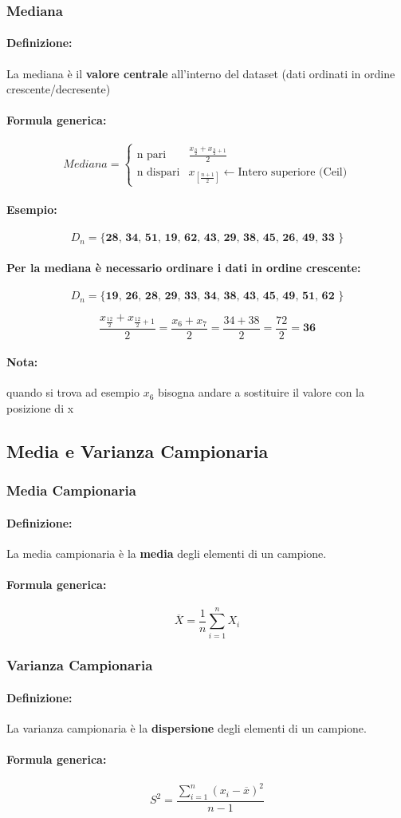 \documentclass[]{article}
\newcommand{\definizione}{\paragraph{Definizione:}}
\newcommand{\formula}{\paragraph{Formula generica:}}
\begin{document}
    \subsubsection{Mediana}
    \definizione La mediana è il \textbf{valore centrale} all'interno del dataset (dati ordinati in ordine crescente/decresente)
    \formula
    \begin{equation*}
        Mediana =
        \begin{cases}
            \text{n pari} &  \frac{x_\frac{n}{2} + x_{\frac{n}{2}+ 1}}{2} \\
            \text{n dispari} & x_{[\frac{n+1}{2}]} \leftarrow \text{Intero superiore (Ceil)}
        \end{cases}
    \end{equation*}
    \paragraph{Esempio:} \[ D_n = \textbf{\{ 28, 34, 51, 19, 62, 43, 29, 38, 45, 26, 49, 33 \}} \]
    \paragraph{Per la mediana è necessario ordinare i dati in ordine crescente:} \[ D_n = \textbf{\{ 19, 26, 28, 29, 33, 34, 38, 43, 45, 49, 51, 62 \}} \]

    \[ \frac{x_{\frac{12}{2}} + x_{\frac{12}{2} + 1}}{2} = \frac{x_6 + x_7}{2} = \frac{34 + 38}{2} = \frac{72}{2} = \textbf{36} \]

    \paragraph{Nota:} quando si trova ad esempio $x_6$ bisogna andare a sostituire il valore con la posizione di x



    \subsection{Media e Varianza Campionaria}
    \subsubsection{Media Campionaria}
    \definizione La media campionaria è la \textbf{media} degli elementi di un campione.
    \formula  \[ \overline{X} = \frac{1}{n} \sum_{i=1}^{n} X_i \]

    \subsubsection{Varianza Campionaria}
    \definizione La varianza campionaria è la \textbf{dispersione} degli elementi di un campione.
    \formula \[ S^2 = \frac{\sum_{i = 1}^{n} (x_i - \overline{x})^2}{n-1} \]
\end{document}
